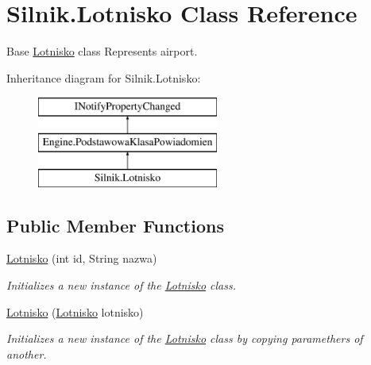 \hypertarget{class_silnik_1_1_lotnisko}{}\section{Silnik.\+Lotnisko Class Reference}
\label{class_silnik_1_1_lotnisko}


Base \mbox{\hyperlink{class_silnik_1_1_lotnisko}{Lotnisko}} class Represents airport.  


Inheritance diagram for Silnik.\+Lotnisko\+:\begin{figure}[H]
\begin{center}
\leavevmode
\includegraphics[height=3.000000cm]{class_silnik_1_1_lotnisko}
\end{center}
\end{figure}
\subsection*{Public Member Functions}
\begin{DoxyCompactItemize}
\item 
\mbox{\hyperlink{class_silnik_1_1_lotnisko_a42eff5febfea199bc94edab1693e801a}{Lotnisko}} (int id, String nazwa)
\begin{DoxyCompactList}\small\item\em Initializes a new instance of the \mbox{\hyperlink{class_silnik_1_1_lotnisko}{Lotnisko}} class. \end{DoxyCompactList}\item 
\mbox{\hyperlink{class_silnik_1_1_lotnisko_af5760fdf88ce17c44f0910b9cce9f1e7}{Lotnisko}} (\mbox{\hyperlink{class_silnik_1_1_lotnisko}{Lotnisko}} lotnisko)
\begin{DoxyCompactList}\small\item\em Initializes a new instance of the \mbox{\hyperlink{class_silnik_1_1_lotnisko}{Lotnisko}} class by copying paramethers of another. \end{DoxyCompactList}\end{DoxyCompactItemize}
